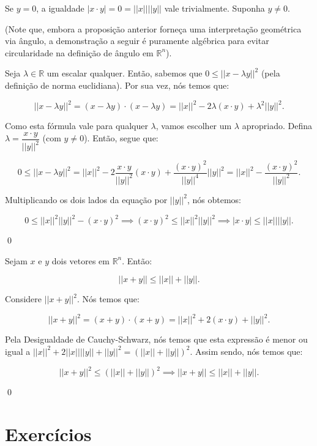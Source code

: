 \begin{Proof}
	Se $y = 0$, a igualdade $|x\cdot y| = 0 = ||x||||y||$ vale trivialmente. Suponha $y \neq 0$.
	
	 (Note que, embora a proposição anterior forneça uma interpretação geométrica via ângulo, a demonstração a seguir é puramente algébrica para evitar circularidade na definição de ângulo em $\mathbb{R}^n$).
	
	Seja $\lambda\in\mathbb{R}$ um escalar qualquer. Então, sabemos que $0\leq ||x - \lambda y||^2$ (pela definição de norma euclidiana). Por sua vez, nós temos que:
	
	$$
	||x - \lambda y||^2 = (x - \lambda y)\cdot(x - \lambda y) = ||x||^2 - 2\lambda(x\cdot y) + \lambda^2||y||^2.
	$$
	
	Como esta fórmula vale para qualquer $\lambda$, vamos escolher um $\lambda$ apropriado. Defina $\lambda = \dfrac{x\cdot y}{||y||^2}$ (com $y\neq 0$). Então, segue que:
	
	$$
	0\leq ||x - \lambda y||^2 = ||x||^2 - 2\dfrac{x\cdot y}{||y||^2}(x\cdot y) + \dfrac{(x\cdot y)^2}{||y||^4}||y||^2 = ||x||^2 - \dfrac{(x\cdot y)^2}{||y||^2}.
	$$
	
	Multiplicando os dois lados da equação por $||y||^2$, nós obtemos:
	
	$$
	0\leq ||x||^2||y||^2 - (x\cdot y)^2 \implies (x\cdot y)^2\leq ||x||^2||y||^2 \implies |x\cdot y|\leq ||x||||y||.
	$$
	
	\qed
\end{Proof}

\begin{Proposition}
	Sejam $x$ e $y$ dois vetores em $\mathbb{R}^n$. Então:
	
	$$
	||x + y||\leq ||x|| + ||y||.
	$$
\end{Proposition}

\begin{Proof}
	Considere $||x + y||^2$. Nós temos que:
	
	$$
	||x + y||^2 = (x + y)\cdot (x + y) = ||x||^2 + 2(x\cdot y) + ||y||^2.
	$$ 
	
	Pela Desigualdade de Cauchy-Schwarz, nós temos que esta expressão é menor ou igual a $||x||^2 + 2||x||||y|| + ||y||^2 = (||x|| + ||y||)^2$. Assim sendo, nós temos que:
	
	$$
	||x + y||^2\leq(||x|| + ||y||)^2 \implies ||x + y||\leq ||x|| + ||y||.
	$$
	
	\qed
\end{Proof}

\section{Exercícios}

